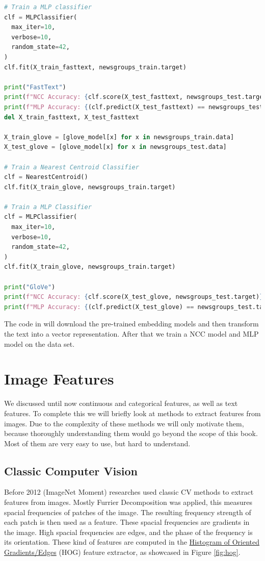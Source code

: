 \begin{lstlisting}[language=Python, caption={20 newsgroups example with embeddings}, label={code:20-newsgroups-embeddings}]
# Train a MLP classifier
clf = MLPClassifier(
  max_iter=10,
  verbose=10,
  random_state=42,
)
clf.fit(X_train_fasttext, newsgroups_train.target)

print("FastText")
print(f"NCC Accuracy: {clf.score(X_test_fasttext, newsgroups_test.target)}")
print(f"MLP Accuracy: {(clf.predict(X_test_fasttext) == newsgroups_test.target).mean()}")
del X_train_fasttext, X_test_fasttext

X_train_glove = [glove_model[x] for x in newsgroups_train.data]
X_test_glove = [glove_model[x] for x in newsgroups_test.data]

# Train a Nearest Centroid Classifier
clf = NearestCentroid()
clf.fit(X_train_glove, newsgroups_train.target)

# Train a MLP Classifier
clf = MLPClassifier(
  max_iter=10,
  verbose=10,
  random_state=42,
)
clf.fit(X_train_glove, newsgroups_train.target)

print("GloVe")
print(f"NCC Accuracy: {clf.score(X_test_glove, newsgroups_test.target)}")
print(f"MLP Accuracy: {(clf.predict(X_test_glove) == newsgroups_test.target).mean()}")
\end{lstlisting}
The code in  will download the pre-trained embedding models and then transform the text into a vector representation.
After that we train a NCC model and MLP model on the data set.

\section{Image Features}
We discussed until now continuous and categorical features, as well as text features.
To complete this we will briefly look at methods to extract features from images.
Due to the complexity of these methods we will only motivate them, because thoroughly understanding them would go beyond the scope of this book.
Most of them are very easy to use, but hard to understand.

\subsection{Classic Computer Vision}
Before 2012 (ImageNet Moment) researches used classic CV methods to extract features from images.
Mostly Furrier Decomposition was applied, this measures spacial frequencies of patches of the image.
The resulting frequency strength of each patch is then used as a feature.
These spacial frequencies are gradients in the image. High spacial frequencies are edges,
and the phase of the frequency is its orientation.
These kind of features are computed in the \underline{Histogram of Oriented Gradients/Edges} (HOG) feature extractor, as showcased in 
Figure \ref{fig:hog}.

